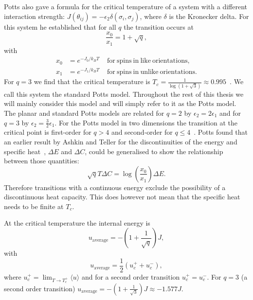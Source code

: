\documentclass[11pt, a4paper]{report} %
\begin{document}
Potts also gave a formula for the critical temperature of a system with a different interaction strength: \(J(\theta_{ij}) = -\epsilon_2 \delta(\sigma_i, \sigma_j)\), where \(\delta\) is the Kronecker delta.
For this system he established that for all \(q\) the transition occurs at~\cite{potts:1952}
\begin{equation}
	\frac{x_0}{x_1} = 1 + \sqrt{q},
\end{equation}
with
\begin{align}
	x_0 &= e^{-J_0 / k_B T} \mathrm{\ \ \ \ \ for\ spins\ in\ like\ orientations,}\\
	x_1 & = e^{-J_1 / k_B T} \mathrm{\ \ \ \ \ for\ spins\ in\ unlike\ orientations}.
\end{align}
For \(q=3\) we find that the critical temperature is \(T_c=\frac{1}{\log(1+\sqrt{3})} \approx 0.995\)~\cite{fan:2007}.
We call this system the standard Potts model.
Throughout the rest of this thesis we will mainly consider this model and will simply refer to it as the Potts model.
The planar and standard Potts models are related for \(q = 2\) by \(\epsilon_2 = 2 \epsilon_1\) and for \(q=3\) by \(\epsilon_2 = \frac{3}{2} \epsilon_1\).
For the Potts model in two dimensions the transition at the critical point is first-order for \(q > 4\) and second-order for \(q \leq 4\)~\cite{wu:1982,baxter:1973}.
Potts found that an earlier result by Ashkin and Teller for the discontinuities of the energy and specific heat~\cite{ashkin:1943}, \(\Delta E\) and \(\Delta C\), could be generalised to show the relationship between those quantities:
\begin{equation}
	\sqrt{q}T \Delta C = \log(\frac{x_0}{x_1}) \Delta E.
\end{equation}
Therefore transitions with a continuous energy exclude the possibility of a discontinuous heat capacity.
This does however not mean that the specific heat needs to be finite at \(T_c\).


At the critical temperature the internal energy is~\cite{baxter:1989,binder:1981a}
\begin{equation}
	u_{\mathrm{average}} = -\left(1+\frac{1}{\sqrt{q}}\right)J,
\end{equation}
with
\begin{equation}
	u_{\mathrm{average}} = \frac{1}{2} (u_c^+ + u_c^-),
\end{equation}
where \(u_c^+ = \lim_{T \to T_c^+} \langle u \rangle\) and for a second order transition \(u_c^+ = u_c^-\).
For \(q=3\) (a second order transition) \(u_{\mathrm{average}} = -(1+\frac{1}{\sqrt{3}})J \approx - 1.577 J\).
\end{document}

